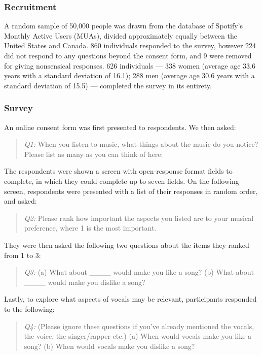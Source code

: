 \documentclass{article}
\begin{document}
\subsubsection{Recruitment}
A random sample of 50,000 people was drawn from the database of Spotify's Monthly Active Users (MUAs), divided approximately equally between the United States and Canada. 860 individuals responded to the survey, however 224 did not respond to any questions beyond the consent form, and 9 were removed for giving nonsensical responses. 626 individuals --- 338 women (average age 33.6 years with a standard deviation of 16.1); 288 men (average age 30.6 years with a standard deviation of 15.5) --- completed the survey in its entirety.

\subsubsection{Survey}
An online consent form was first presented to respondents. We then asked:

{\small
\begin{quote}
  \emph{Q1:} When you listen to music, what things about the music do you notice? Please list as many as you can think of here:
\end{quote}
}
The respondents were shown a screen with open-response format fields to complete, in which they could complete up to seven fields.
On the following screen, respondents were presented with a list of their responses in random order, and asked:

{\small
\begin{quote}
  \emph{Q2:} Please rank how important the aspects you listed are to your musical preference, where 1 is the most important.
\end{quote}
}

They were then asked the following two questions about the items they ranked from 1 to 3:

{\small
\begin{quote}
  \emph{Q3:}  (a) What about \_\_\_\_ would make you like a song? (b) What about \_\_\_\_ would make you dislike a song?
\end{quote}
}

Lastly, to explore what aspects of vocals may be relevant, participants responded to the following:

{\small
\begin{quote}
  \emph{Q4:} (Please ignore these questions if you've already mentioned the vocals, the voice, the singer/rapper etc.)
  (a) When would vocals make you like a song? (b) When would vocals make you dislike a song?
\end{quote}
}
\end{document}

